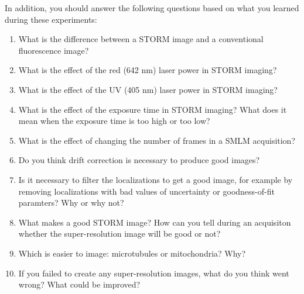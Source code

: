\documentclass[10pt,a4paper,oneside]{book}
\begin{document}
In addition, you should answer the following questions based on what you learned during these experiments:

\begin{enumerate}
    \item{What is the difference between a STORM image and a conventional fluorescence image?}
    \item{What is the effect of the red (642 nm) laser power in STORM imaging?}
    \item{What is the effect of the UV (405 nm) laser power in STORM imaging?}
    \item{What is the effect of the exposure time in STORM imaging? What does it mean when the exposure time is too high or too low?}
    \item{What is the effect of changing the number of frames in a SMLM acquisition?}
    \item{Do you think drift correction is necessary to produce good images?}
    \item{Is it necessary to filter the localizations to get a good image, for example by removing localizations with bad values of uncertainty or goodness-of-fit paramters? Why or why not?}
    \item{What makes a good STORM image? How can you tell during an acquisiton whether the super-resolution image will be good or not?}
    \item{Which is easier to image: microtubules or mitochondria? Why?}
    \item{If you failed to create any super-resolution images, what do you think went wrong? What could be improved?}
\end{enumerate}
\end{document}
